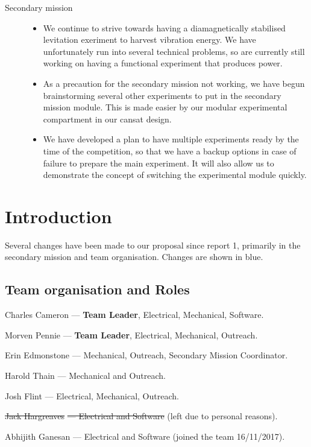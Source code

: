 \documentclass{report}
\begin{document}
\begin{description}
		\item[Secondary mission] \hfill \begin{itemize}
			\item We continue to strive towards having a diamagnetically 
			stabilised levitation exeriment to harvest vibration energy. We have
			unfortunately run into several technical problems, so are currently
			still working on having a functional experiment that produces power.
			\item As a precaution for the secondary mission not working, we 
			have begun brainstorming several other experiments to put in the
			secondary mission module. This is made easier by our modular
			experimental compartment in our cansat design.
			\item We have developed a plan to have multiple experiments ready
			by the time of the competition, so that we have a backup options
			in case of failure to prepare the main experiment. It will also allow
			us to demonstrate the concept of switching the experimental module 
			quickly.
		\end{itemize}

	\end{description}

	\chapter{Introduction}
	Several changes have been made to our proposal since report 1, 
	primarily in the secondary mission and team organisation. 
	Changes are shown in blue.
	\section{Team organisation and Roles}
		\begin{description}
			\item{Charles Cameron} --- \textbf{Team Leader}, Electrical, 
			Mechanical, Software.
			\item{Morven Pennie} --- \textbf{Team Leader}, Electrical,
			Mechanical, Outreach.
			\item{Erin Edmonstone} --- Mechanical, Outreach, 
			{\color{blue}Secondary Mission Coordinator.}
			\item{Harold Thain} --- Mechanical and Outreach.
			\item{Josh Flint} --- Electrical, Mechanical, Outreach.
			\color{blue}
			\item{\sout{Jack Hargreaves}}\sout{ --- Electrical and Software} (left
			due to personal reasons).
			\item{Abhijith Ganesan} --- Electrical and Software (joined the team 
			16/11/2017).
	 	\end{description}
	
\end{document}
